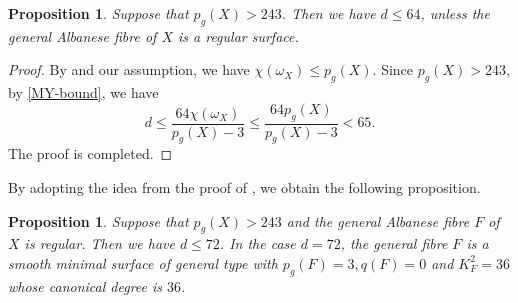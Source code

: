\documentclass[11pt]{amsart}
\theoremstyle{plain}
\newtheorem{prop}[thm]{Proposition}
\theoremstyle{definition}
\numberwithin{equation}{section}
\begin{document}
\begin{prop}\label{keyprop1}
Suppose that $p_g(X)>243$. Then we have $d\leq 64$, unless the general Albanese fibre of $X$ is a regular surface.
\end{prop}
\begin{proof}
By \cite[Proposition 2.1]{CH06} and our assumption, we have $\chi(\omega_X)\leq p_g(X)$.
Since $p_g(X)>243$, by \eqref{MY-bound}, we have
\[
d\leq \frac{64\chi(\omega_X)}{p_g(X)-3}\leq \frac{64p_g(X)}{p_g(X)-3}< 65.
\]
The proof is completed.

\end{proof}
By adopting the idea from the proof of \cite[Theorem 5]{Xia86}, we obtain the following proposition.
\begin{prop}\label{keyprop2}
    Suppose that $p_g(X)>243$ and the general Albanese fibre $F$ of $X$ is regular. Then we have $d\leq 72$. In the case $d=72$, the general fibre $F$ is a smooth  minimal surface of general type with $p_g(F)=3,q(F)=0$ and $K_F^2=36$ whose canonical degree is $36$.
\end{prop}
\end{document}
